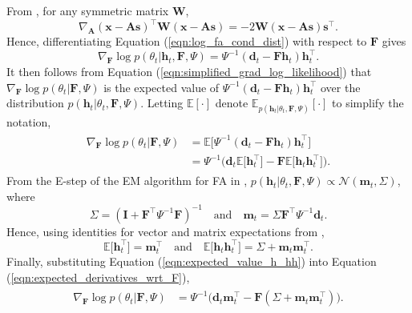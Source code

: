 \documentclass[msc,deptreport.inf]{infthesis} %
\newcommand{\matr}[1]{\mathbf{#1}}
\newcommand{\E}{\mathbb E}
\begin{document}
From \cite{petersen2012}, for any symmetric matrix $\matr{W}$,
\begin{equation}
	\nabla_{\matr{A}} (\matr{x} - \matr{As})^\intercal \matr{W} (\matr{x} - \matr{As}) = -2 \matr{W} (\matr{x} - \matr{As}) \matr{s}^\intercal.
\end{equation}
Hence, differentiating Equation (\ref{eqn:log_fa_cond_dist}) with respect to $\matr{F}$ gives
\begin{equation}
	\nabla_{\matr{F}} \log p(\theta_t | \matr{h}_t, \matr{F}, \Psi)
	= \Psi^{-1} (\matr{d}_t - \matr{Fh}_t) \matr{h}_t^\intercal.
\end{equation}
It then follows from Equation (\ref{eqn:simplified_grad_log_likelihood}) that $\nabla_{\matr{F}} \log p(\theta_t | \matr{F}, \Psi)$ is the expected value of $\Psi^{-1} (\matr{d}_t - \matr{Fh}_t) \matr{h}_t^\intercal$ over the distribution $p(\matr{h}_t | \theta_t, \matr{F}, \Psi)$. Letting $\E[\cdot]$ denote $\E_{p(\matr{h}_t | \theta_t, \matr{F}, \Psi)}[\cdot]$ to simplify the notation, 
\begin{align}\label{eqn:expected_derivatives_wrt_F}
\begin{split}
	\nabla_{\matr{F}} \log p(\theta_t | \matr{F}, \Psi) 
	& = \E \big[ \Psi^{-1} (\matr{d}_t - \matr{Fh}_t) \matr{h}_t^\intercal \big] \\
	& = \Psi^{-1}\big( \matr{d}_t \E \big[ \matr{h}_t^\intercal \big] 
	- \matr{F}  \E \big[ \matr{h}_t \matr{h}_t^\intercal \big]\big).
\end{split}
\end{align} 
From the E-step of the EM algorithm for FA in \cite{barber2007}, $p(\matr{h}_t | \theta_t, \matr{F}, \Psi) \propto \mathcal{N}(\matr{m}_t, \Sigma)$, where
\begin{equation}\label{eqn:variational_params}
	\Sigma = (\matr{I} + \matr{F}^\intercal \Psi^{-1} \matr{F})^{-1}
	\quad \text{and} \quad \matr{m}_t = \Sigma \matr{F}^\intercal \Psi^{-1} \matr{d}_t.
\end{equation}
Hence, using identities for vector and matrix expectations from \cite{petersen2012}, 
\begin{equation}\label{eqn:expected_value_h_hh}
	\E \big[ \matr{h}_t^\intercal \big] = \matr{m}_t^\intercal \quad \text{and} \quad \E \big[ \matr{h}_t \matr{h}_t^\intercal \big] = \Sigma + \matr{m}_t \matr{m}_t^\intercal.
\end{equation}
Finally, substituting Equation (\ref{eqn:expected_value_h_hh}) into Equation (\ref{eqn:expected_derivatives_wrt_F}), 
\begin{align}\label{eqn:derivatives_wrt_F}
\begin{split}
	\nabla_{\matr{F}} \log p(\theta_t | \matr{F}, \Psi) 
	& = \Psi^{-1} \big(\matr{d}_t \matr{m}_t^\intercal - \matr{F}  (\Sigma + \matr{m}_t \matr{m}_t^\intercal)\big).
\end{split}
\end{align} 
\end{document}
